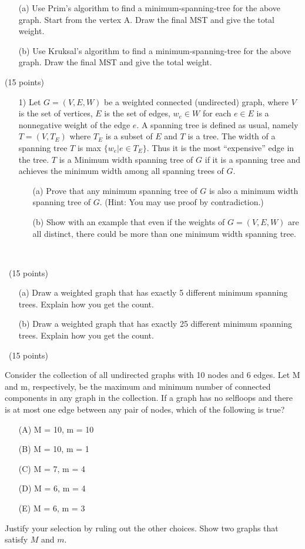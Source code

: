 \documentclass[12pt]{article}
\newcommand{\vs}{\vspace{2mm}}
\begin{document}
\begin{itemize}
    \item[(a)]  Use Prim's algorithm to find a minimum-spanning-tree  for the above graph. Start from the vertex A. Draw the final MST and give the total weight.
    \item[(b)]  Use Kruksal's algorithm to find a minimum-spanning-tree  for the above graph.  Draw the final MST and give the total weight.
\end{itemize}

(15 points)
\begin{itemize}
    \item[1)]  Let $G = (V,E,W)$ be a weighted connected (undirected) graph, where $V$ is the set of vertices, $E$ is the set of edges, $w_e \in W$ for each $e \in E$ is a nonnegative weight of the edge $e$. A spanning tree is defined as usual, namely $T = (V, T_E)$ where $T_E$ is a subset of  $E$ and $T$ is a tree. The width of a spanning tree $T$ is max $\{w_e | e \in T_E \}$.  Thus it is the most “expensive” edge in the tree. $T$ is a Minimum width spanning tree of $G$ if it is a spanning tree and achieves the minimum width among all spanning trees of $G.$ 
    \begin{itemize} 
        \item[(a)] Prove that any minimum spanning tree of $G$ is also a minimum width spanning tree of $G$. (Hint: You may use proof by contradiction.)
        \item[(b)] Show with an example that even if the weights of $G = (V,E,W)$ are all distinct, there could be more than one minimum width spanning tree.
    \end{itemize}
\end{itemize}

\vs\

\pagebreak

\vs\
(15 points)
\vs\

\begin{itemize}
    \item[(a)] Draw a weighted graph that has exactly 5 different minimum spanning trees. Explain how you get the count.
    \item[(b)] Draw a weighted graph that has exactly 25 different minimum spanning trees. Explain how you get the count.
\end{itemize}


\vs\
(15 points)
\vs\

Consider the collection of all undirected graphs with 10 nodes and 6 edges. Let M and m, respectively, be the
maximum and minimum number of connected components in any graph in the collection. If a graph has no selfloops
and there is at most one edge between any pair of nodes, which of the following is true? 
\begin{itemize}
    \item[(A)] M = 10, m = 10
    \item[(B)] M = 10, m = 1
    \item[(C)] M = 7, m = 4
    \item[(D)] M = 6, m = 4
    \item[(E)] M = 6, m = 3
\end{itemize}

Justify your selection by ruling out the other choices. Show two graphs that satisfy $M$ and $m$.
\end{document}
